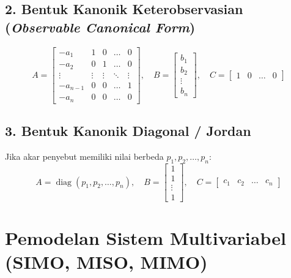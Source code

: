 \documentclass[11pt,a4paper]{article}
\begin{document}
\subsection{2. Bentuk Kanonik Keterobservasian (\textit{Observable Canonical Form})}
\begin{equation*}
    A = \begin{bmatrix}
        -a_1 & 1 & 0 & \dots & 0 \\
        -a_2 & 0 & 1 & \dots & 0 \\
        \vdots & \vdots & \vdots & \ddots & \vdots \\
        -a_{n-1} & 0 & 0 & \dots & 1 \\
        -a_n & 0 & 0 & \dots & 0
    \end{bmatrix}, \quad
    B = \begin{bmatrix} b_1 \\ b_2 \\ \vdots \\ b_n \end{bmatrix}, \quad
    C = \begin{bmatrix} 1 & 0 & \dots & 0 \end{bmatrix}
\end{equation*}

\subsection{3. Bentuk Kanonik Diagonal / Jordan}
Jika akar penyebut memiliki nilai berbeda $p_1, p_2, \dots, p_n$:
\begin{equation*}
    A = \operatorname{diag}(p_1, p_2, \dots, p_n), \quad B = \begin{bmatrix} 1 \\ 1 \\ \vdots \\ 1 \end{bmatrix}, \quad C = \begin{bmatrix} c_1 & c_2 & \dots & c_n \end{bmatrix}
\end{equation*}

\vspace{6pt}

\section{Pemodelan Sistem Multivariabel (SIMO, MISO, MIMO)}
\end{document}
